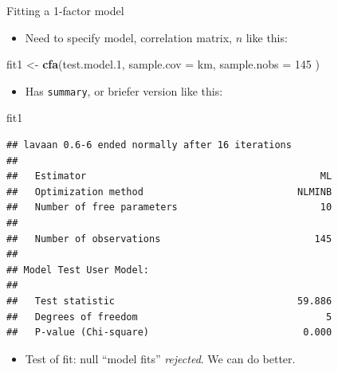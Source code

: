 \documentclass[
  ignorenonframetext,
]{beamer}
\newenvironment{Shaded}{\begin{snugshade}}{\end{snugshade}}
\newcommand{\DataTypeTok}[1]{\textcolor[rgb]{0.13,0.29,0.53}{#1}}
\newcommand{\DecValTok}[1]{\textcolor[rgb]{0.00,0.00,0.81}{#1}}
\newcommand{\FloatTok}[1]{\textcolor[rgb]{0.00,0.00,0.81}{#1}}
\newcommand{\KeywordTok}[1]{\textcolor[rgb]{0.13,0.29,0.53}{\textbf{#1}}}
\newcommand{\NormalTok}[1]{#1}
\newcommand{\StringTok}[1]{\textcolor[rgb]{0.31,0.60,0.02}{#1}}
\providecommand{\tightlist}{%
  \setlength{\itemsep}{0pt}\setlength{\parskip}{0pt}}
\begin{document}
\begin{frame}[fragile]{Fitting a 1-factor model}
\protect\hypertarget{fitting-a-1-factor-model}{}

\begin{itemize}
\tightlist
\item
  Need to specify model, correlation matrix, \(n\) like this:
\end{itemize}

\begin{Shaded}
\begin{Highlighting}[]
\NormalTok{fit1 <-}\StringTok{ }\KeywordTok{cfa}\NormalTok{(test.model}\FloatTok{.1}\NormalTok{,}
  \DataTypeTok{sample.cov =}\NormalTok{ km,}
  \DataTypeTok{sample.nobs =} \DecValTok{145}
\NormalTok{)}
\end{Highlighting}
\end{Shaded}

\begin{itemize}
\tightlist
\item
  Has \texttt{summary}, or briefer version like this:
\end{itemize}

\scriptsize

\begin{Shaded}
\begin{Highlighting}[]
\NormalTok{fit1}
\end{Highlighting}
\end{Shaded}

\begin{verbatim}
## lavaan 0.6-6 ended normally after 16 iterations
## 
##   Estimator                                         ML
##   Optimization method                           NLMINB
##   Number of free parameters                         10
##                                                       
##   Number of observations                           145
##                                                       
## Model Test User Model:
##                                                       
##   Test statistic                                59.886
##   Degrees of freedom                                 5
##   P-value (Chi-square)                           0.000
\end{verbatim}

\normalsize

\begin{itemize}
\tightlist
\item
  Test of fit: null ``model fits'' \emph{rejected}. We can do better.
\end{itemize}

\end{frame}
\end{document}
